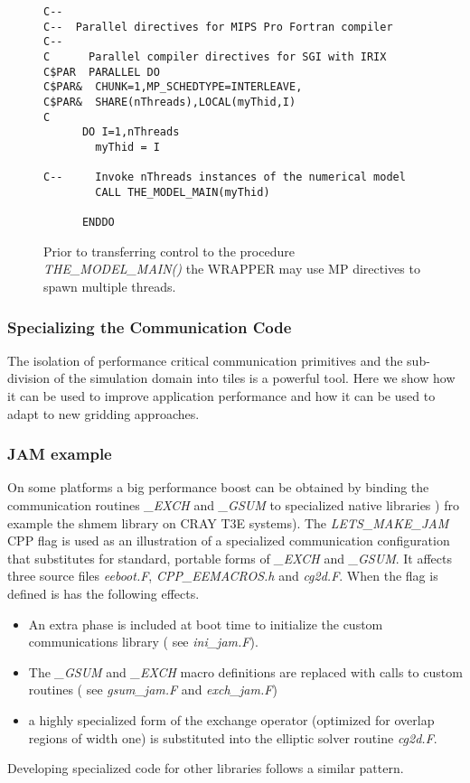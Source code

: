 \begin{figure}
\begin{verbatim}
C--
C--  Parallel directives for MIPS Pro Fortran compiler
C--
C      Parallel compiler directives for SGI with IRIX
C$PAR  PARALLEL DO
C$PAR&  CHUNK=1,MP_SCHEDTYPE=INTERLEAVE,
C$PAR&  SHARE(nThreads),LOCAL(myThid,I)
C
      DO I=1,nThreads
        myThid = I

C--     Invoke nThreads instances of the numerical model
        CALL THE_MODEL_MAIN(myThid)

      ENDDO
\end{verbatim}
\caption{Prior to transferring control to
the procedure {\em THE\_MODEL\_MAIN()} the WRAPPER may use
MP directives to spawn multiple threads.
} \label{fig:mp_directives}
\end{figure}


\subsubsection{Specializing the Communication Code}

The isolation of performance critical communication primitives and the
sub-division of the simulation domain into tiles is a powerful tool.
Here we show how it can be used to improve application performance and
how it can be used to adapt to new gridding approaches.

\subsubsection{JAM example}
\label{sec:jam_example}
On some platforms a big performance boost can be obtained by
binding the communication routines {\em \_EXCH} and
{\em \_GSUM} to specialized native libraries ) fro example the
shmem library on CRAY T3E systems). The {\em LETS\_MAKE\_JAM} CPP flag 
is used as an illustration of a specialized communication configuration 
that substitutes for standard, portable forms of {\em \_EXCH} and 
{\em \_GSUM}. It affects three source files {\em eeboot.F}, 
{\em CPP\_EEMACROS.h} and {\em cg2d.F}. When the flag is defined
is has the following effects.
\begin{itemize}
\item An extra phase is included at boot time to initialize the custom 
communications library ( see {\em ini\_jam.F}).
\item The {\em \_GSUM} and {\em \_EXCH} macro definitions are replaced
with calls to custom routines ( see {\em gsum\_jam.F} and {\em exch\_jam.F})
\item a highly specialized form of the exchange operator (optimized
for overlap regions of width one) is substituted into the elliptic
solver routine {\em cg2d.F}.
\end{itemize}
Developing specialized code for other libraries follows a similar
pattern.

